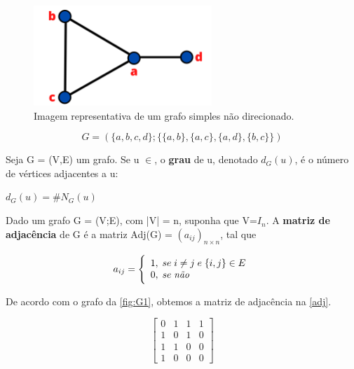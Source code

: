 \begin{figure}[htb]
	\caption{\label{fig:G1} Imagem representativa de um grafo simples não direcionado.}
	\begin{center}
		\includegraphics[width=0.6\textwidth]{images/grafo.png}
	\end{center}
\end{figure}

\begin{equation}
    G = (\{a,b,c,d\}; \{\{a,b\},\{a,c\},\{a,d\}, \{b,c\}\})
\end{equation}

\begin{definition}
Seja G = (V,E) um grafo. Se u $\in$, o \textbf{grau} de u, denotado $d_G(u)$, é o número de vértices adjacentes a u: 
\begin{center}
$d_G(u) = \#N_G(u)$
\end{center}
\end{definition}

\begin{definition}
Dado um grafo G = (V;E), com |V| = n, suponha que V=$I_n$. A \textbf{matriz de adjacência} de G é a matriz Adj(G) = $(a_{ij})_{n\times n}$, tal que
\begin{center}
\begin{equation*}
a_{ij}= \Bigg{\{} \begin{array}{ll} 1, \; se \; i\neq j  \; e \; \{i,j\} \in E \\ 0, \; se \; \textrm{\textit{não}} \end{array}
\end{equation*}
\end{center}
\end{definition}

De acordo com o grafo da \autoref{fig:G1}, obtemos a matriz de adjacência na \autoref{adj}.

\begin{equation}
\label{adj}
    \begin{bmatrix}
       0 & 1 & 1 & 1 \\
       1 & 0 & 1 & 0 \\
       1 & 1 & 0 & 0 \\
       1 & 0 & 0 & 0 
    \end{bmatrix}
\end{equation}
